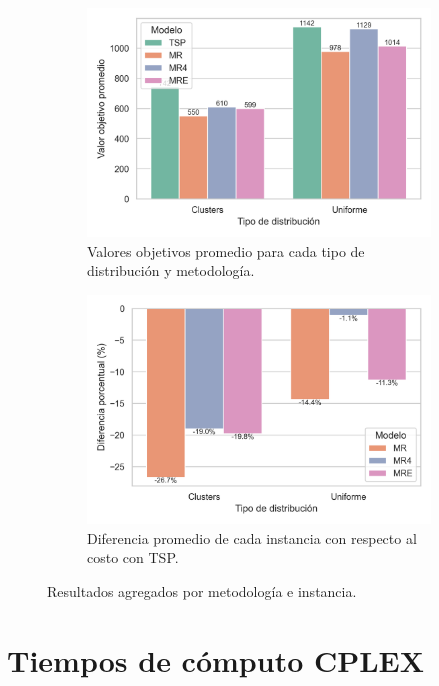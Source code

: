 \documentclass[10pt]{article}
\begin{document}
\begin{figure}[htbp]
	\centering
	
	\begin{subfigure}[b]{0.49\textwidth}
		\centering
		\includegraphics[width=\textwidth]{figuras/barras_costos.png}
		\caption{Valores objetivos promedio para cada tipo de distribución y metodología.}
		\label{fig:barras_costos}
	\end{subfigure}
	\hfill
	\begin{subfigure}[b]{0.49\textwidth}
		\centering
		\includegraphics[width=\textwidth]{figuras/barras_diferencias_pct.png}
		\caption{Diferencia promedio de cada instancia con respecto al costo con TSP.}
		\label{fig:dif_pct_costos}
	\end{subfigure}
	
	\caption{Resultados agregados por metodología e instancia.}
	\label{fig:comparacion_costos}
\end{figure}


\clearpage

\section{Tiempos de cómputo CPLEX}
\end{document}
